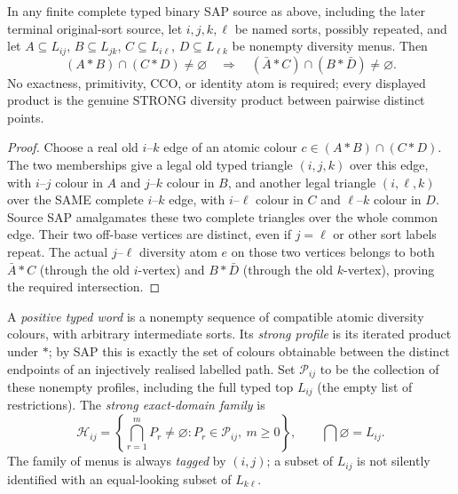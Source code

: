 \begin{lemma}
\label{lem:typed-set-pasch}
In any finite complete typed binary SAP source as above,
including the later terminal original-sort source, let
$i,j,k,\ell$ be named sorts, possibly repeated, and let
$A\subseteq L_{ij}$,
$B\subseteq L_{jk}$, $C\subseteq L_{i\ell}$,
$D\subseteq L_{\ell k}$ be nonempty diversity
menus.  Then
\[
 (A*B)\cap(C*D)\ne\varnothing
 \quad\Longrightarrow\quad
 (\bar A*C)\cap(B*\bar D)\ne\varnothing.
\]
No exactness, primitivity, CCO, or identity atom is
required; every displayed product is the genuine STRONG
diversity product between pairwise distinct points.
\end{lemma}
\begin{proof}
Choose a real old $i$--$k$ edge of an atomic colour
$c\in(A*B)\cap(C*D)$.  The two memberships give a
legal old typed triangle $(i,j,k)$ over this edge,
with $i$--$j$ colour in $A$ and $j$--$k$ colour
in $B$, and another legal triangle $(i,\ell,k)$
over the SAME complete $i$--$k$ edge, with
$i$--$\ell$ colour in $C$ and $\ell$--$k$
colour in $D$.  Source SAP amalgamates these
two complete triangles over the whole common edge.
Their two off-base vertices are distinct, even if
$j=\ell$ or other sort labels repeat.  The actual
$j$--$\ell$ diversity atom $e$ on those two vertices
belongs to both $\bar A*C$ (through the old
$i$-vertex) and $B*\bar D$ (through the old
$k$-vertex), proving the required intersection.
\end{proof}

A \emph{positive typed word} is a nonempty sequence of compatible
atomic diversity colours, with arbitrary intermediate sorts.  Its
\emph{strong profile} is its iterated product under $*$; by SAP this
is exactly the set of colours obtainable between the distinct
endpoints of an injectively realised labelled path.  Set
$\mathcal P_{ij}$ to be the collection of these nonempty profiles,
including the full typed top $L_{ij}$ (the empty list of restrictions).
The \emph{strong exact-domain family} is
\begin{equation}\label{eq:typed-H-definition}
 \mathcal H_{ij}=\left\{\bigcap_{r=1}^m P_r\ne\varnothing:
     P_r\in\mathcal P_{ij},\ m\ge0\right\},
 \qquad\bigcap\varnothing=L_{ij}.
\end{equation}
The family of menus is always \emph{tagged} by $(i,j)$; a subset
of $L_{ij}$ is not silently identified with an equal-looking subset
of $L_{k\ell}$.

